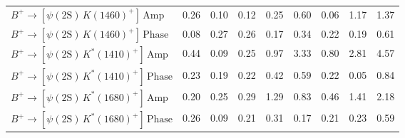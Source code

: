 \begin{tabular}{l  c  c  c  c  c  c  c  | c }
$B^{+}\rightarrow \left[\psi(\text{2S})\,K(1460)^{+}\right]\,\text{Amp}$ & 0.26 & 0.10 & 0.12 & 0.25 & 0.60 & 0.06 & 1.17 & 1.37 \\ 
$B^{+}\rightarrow \left[\psi(\text{2S})\,K(1460)^{+}\right]\,\text{Phase}$ & 0.08 & 0.27 & 0.26 & 0.17 & 0.34 & 0.22 & 0.19 & 0.61 \\ 
$B^{+}\rightarrow \left[\psi(\text{2S})\,K^{*}(1410)^{+}\right]\,\text{Amp}$ & 0.44 & 0.09 & 0.25 & 0.97 & 3.33 & 0.80 & 2.81 & 4.57 \\ 
$B^{+}\rightarrow \left[\psi(\text{2S})\,K^{*}(1410)^{+}\right]\,\text{Phase}$ & 0.23 & 0.19 & 0.22 & 0.42 & 0.59 & 0.22 & 0.05 & 0.84 \\ 
$B^{+}\rightarrow \left[\psi(\text{2S})\,K^{*}(1680)^{+}\right]\,\text{Amp}$ & 0.20 & 0.25 & 0.29 & 1.29 & 0.83 & 0.46 & 1.41 & 2.18 \\ 
$B^{+}\rightarrow \left[\psi(\text{2S})\,K^{*}(1680)^{+}\right]\,\text{Phase}$ & 0.26 & 0.09 & 0.21 & 0.31 & 0.17 & 0.21 & 0.23 & 0.59 \\ 
\hline
\hline
\end{tabular}
